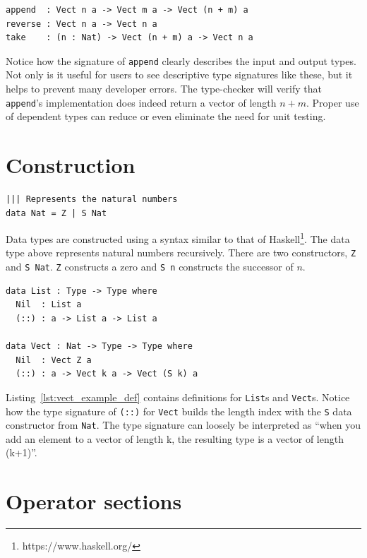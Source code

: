 \documentclass[12pt]{report}
\begin{document}
\begin{lstlisting}[caption={Vector Operations Example},label={lst:vector_ops_example}]
append  : Vect n a -> Vect m a -> Vect (n + m) a
reverse : Vect n a -> Vect n a
take    : (n : Nat) -> Vect (n + m) a -> Vect n a
\end{lstlisting}

Notice how the signature of \texttt{append} clearly describes the input and output types.
Not only is it useful for users to see descriptive type signatures like these, but it helps to prevent many developer errors.
The type-checker will verify that \texttt{append}'s implementation does indeed return a vector of length $n+m$.
Proper use of dependent types can reduce or even eliminate the need for unit testing.

\section{Construction}

\begin{lstlisting}[caption={Nat definition},label={lst:nats_example}]
||| Represents the natural numbers
data Nat = Z | S Nat
\end{lstlisting}

Data types are constructed using a syntax similar to that of Haskell\footnote{https://www.haskell.org/}.
The data type above represents natural numbers recursively.
There are two constructors, \lstinline{Z} and \lstinline{S Nat}.
\lstinline{Z} constructs a zero and \lstinline{S n} constructs the successor of $n$.

\begin{lstlisting}[caption={List and Vect definitions},label={lst:vect_example_def}]
data List : Type -> Type where
  Nil  : List a
  (::) : a -> List a -> List a

data Vect : Nat -> Type -> Type where
  Nil  : Vect Z a
  (::) : a -> Vect k a -> Vect (S k) a
\end{lstlisting}

Listing~\ref{lst:vect_example_def} contains definitions for \texttt{List}s and \texttt{Vect}s.
Notice how the type signature of \texttt{(::)} for \texttt{Vect} builds the length index with the \texttt{S} data constructor from \texttt{Nat}.
The type signature can loosely be interpreted as ``when you add an element to a vector of length k, the resulting type is a vector of length (k+1)''.

\section{Operator sections}
\end{document}
